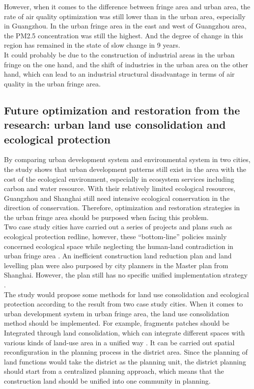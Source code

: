 However, when it comes to the difference between fringe area and urban area, the rate of air quality optimization was still lower than in the urban area, especially in Guangzhou. In the urban fringe area in the east and west of Guangzhou area, the PM2.5 concentration was still the highest. And the degree of change in this region has remained in the state of slow change in 9 years.\\

It could probably be due to the construction of industrial areas in the urban fringe on the one hand, and the shift of industries in the urban area on the other hand, which can lead to an industrial structural disadvantage in terms of air quality in the urban fringe area.\\



\subsection{Future optimization and restoration from the research: urban land use consolidation and ecological protection}
By comparing urban development system and environmental system in two cities, the study shows that urban development patterns still exist in the area with the cost of the ecological environment, especially in ecosystem services including carbon and water resource. With their relatively limited ecological resources, Guangzhou and Shanghai still need intensive ecological conservation in the direction of conservation. Therefore, optimization and restoration strategies in the urban fringe area should be purposed when facing this problem. \\

Two case study cities have carried out a series of projects and plans such as ecological protection redline, however, these “bottom-line” policies mainly concerned ecological space while neglecting the human-land contradiction in urban fringe area \parencite{xu_developing_2021}. An inefficient construction land reduction plan and land levelling plan were also purposed by city planners in the Master plan from Shanghai. However, the plan still has no specific unified implementation strategy \parencite{sun_road_2021}.\\

The study would propose some methods for land use consolidation and ecological protection according to the result from two case study cities. When it comes to urban development system in urban fringe area, the land use consolidation method should be implemented. For example, fragments patches should be Integrated through land consolidation, which can integrate different spaces with various kinds of land-use area in a unified way \parencite{bush_building_2019}. It can be carried out spatial reconfiguration in the planning process in the district area. Since the planning of land functions would take the district as the planning unit, the district planning should start from a centralized planning approach, which means that the construction land should be unified into one community in planning.\\

